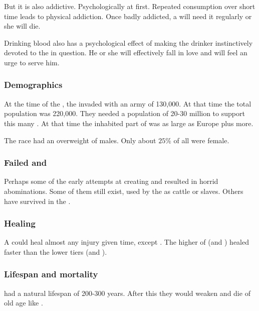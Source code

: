 But it is also addictive.
Psychologically at first.
Repeated consumption over short time leads to physical addiction.
Once badly addicted, a \human will need it regularly or she will die.

Drinking \resphan blood also has a psychological effect of making the drinker instinctively devoted to the \resphan in question.
He or she will effectively fall in love and will feel an urge to serve him.





\subsubsection{Demographics}
At the time of the , the \resphain invaded with an army of 130,000. 
At that time the total \resphan population was 220,000.
They needed a population of 20-30 million \humans to support this many \resphain.
At that time the inhabited part of \Nyx was as large as Europe plus more.

The race had an overweight of males. 
Only about $25\%$ of all \resphain were female. 





\subsubsection{Failed \resphain{} and \humans}
Perhaps some of the early attempts at creating \resphain{} and \humans{} resulted in horrid abominations. 
Some of them still exist, used by the \resphain{} as cattle or slaves. 
Others have survived in the . 





\subsubsection{Healing}
A \resphan could heal almost any injury given time, except . 
The higher  of \resphain (\satharioth and \ketherain) healed faster than the lower tiers (\thelyadeth and \bezedeth). 





\subsubsection{Lifespan and mortality}
\Resphain had a natural lifespan of 200-300 years. 
After this they would weaken and die of old age like \humans. 

